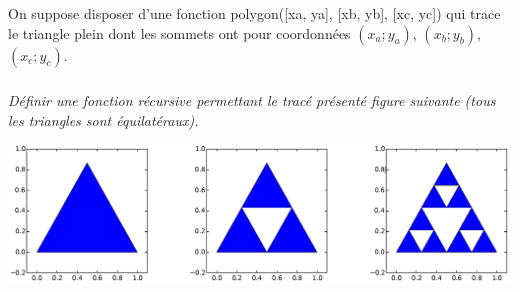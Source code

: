 \documentclass[10pt,fleqn]{book} %
\begin{document}
\begin{multicols}{2}
On suppose disposer d’une fonction \textsf{polygon([xa, ya], [xb, yb], [xc, yc])} qui trace le
triangle plein dont les sommets ont pour coordonnées $(x_a;y_a)$, $(x_b;y_b)$, $(x_c;y_c)$. 
\subparagraph{}
\textit{Définir une fonction récursive permettant le tracé présenté figure suivante (tous les triangles sont équilatéraux).}

\begin{center}
\includegraphics[width=.95\linewidth]{images/fig_04}
\end{center}




\end{multicols}

\end{document}
